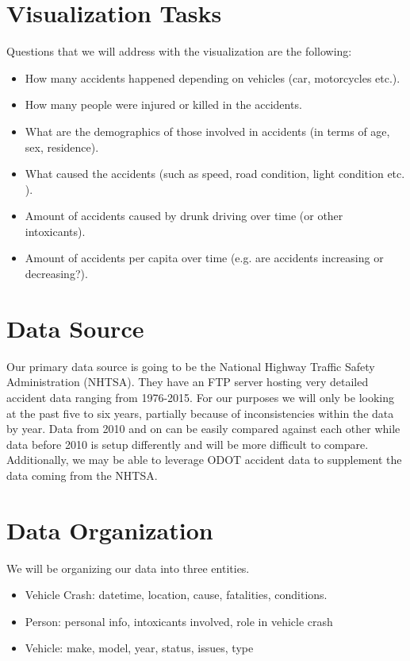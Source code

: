 \documentclass[journal]{vgtc}                %
\begin{document}
\section{Visualization Tasks}

Questions that we will address with the visualization are the following:
\begin{itemize}
  \item How many accidents happened depending on vehicles (car, motorcycles etc.).
  \item How many people were injured or killed in the accidents.
  \item What are the demographics of those involved in accidents (in terms of age, sex, residence).
  \item What caused the accidents (such as speed, road condition, light condition etc. ).
  \item Amount of accidents caused by drunk driving over time (or other intoxicants).
  \item Amount of accidents per capita over time (e.g. are accidents increasing or decreasing?).
\end{itemize}

\section{Data Source}

Our primary data source is going to be the National Highway Traffic Safety Administration (NHTSA). 
They have an FTP server hosting very detailed accident data ranging from 1976-2015. 
For our purposes we will only be looking at the past five to six years, partially because of inconsistencies within the data by year. 
Data from 2010 and on can be easily compared against each other while data before 2010 is setup differently and will be more difficult to compare. 
Additionally, we may be able to leverage ODOT accident data to supplement the data coming from the NHTSA.

\section{Data Organization}

We will be organizing our data into three entities. 
\begin{itemize}
  \item Vehicle Crash: datetime, location, cause, fatalities, conditions.
  \item Person: personal info, intoxicants involved, role in vehicle crash 
  \item Vehicle: make, model, year, status, issues, type
\end{itemize}
\end{document}
